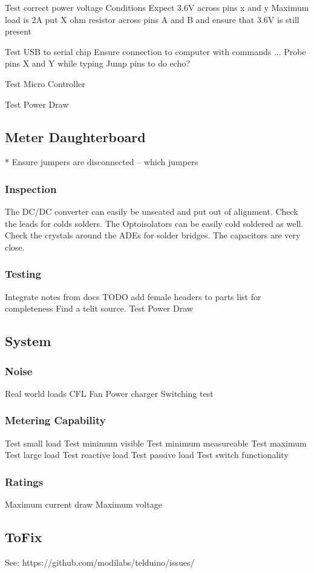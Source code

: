 \documentclass[]{article}
\begin{document}
            Test correct power voltage
            Conditions
            Expect 3.6V across pins x and y
            Maximum load is 2A put X ohm resistor across pins A and B and ensure that 3.6V is still present

            Test USB to serial chip
            Ensure connection to computer with commands ...
            Probe pins X and Y while typing
            Jump pins to do echo?

            Test Micro Controller

            Test Power Draw

    \subsection{Meter Daughterboard}
        * Ensure jumpers are disconnected
             -- which jumpers
        \subsubsection{Inspection}
            The DC/DC converter can easily be unseated and put out of alignment. Check the leads for colds solders.
            The Optoisolators can be easily cold soldered as well.
            Check the crystals around the ADEs for solder bridges. The capacitors are very close.
        \subsubsection{Testing}

            Integrate notes from docs
            TODO add female headers to parts list for completeness
            Find a telit source.
            Test Power Draw
    \subsection{System}
    \subsubsection{Noise}
        Real world loads
        CFL
        Fan
        Power charger
        Switching test

    \subsubsection{Metering Capability}
    Test small load
    Test minimum visible
    Test minimum measureable
    Test maximum
    Test large load
    Test reactive load
    Test passive load
    Test switch functionality
    \subsubsection{Ratings}
    Maximum current draw
    Maximum voltage

    \subsection{ToFix}
        See: https://github.com/modilabs/telduino/issues/
\end{document}
